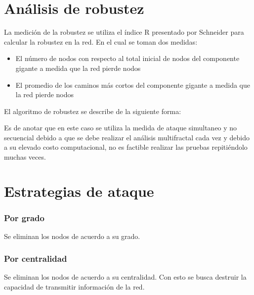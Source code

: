 \section{Análisis de robustez}

La medición de la robustez se utiliza el índice R presentado por Schneider\cite{Schneider2011} para calcular la robustez en la red. En el cual se toman dos medidas:

\begin{itemize}
    \item El número de nodos con respecto al total inicial de nodos del componente gigante a medida que la red pierde nodos
    \item El promedio de los caminos más cortos del componente gigante a medida que la red pierde nodos
\end{itemize}

El algoritmo de robustez se describe de la siguiente forma:


Es de anotar que en este caso se utiliza la medida de ataque simultaneo y no secuencial debido a que se debe realizar el análisis multifractal cada vez y debido a su elevado costo computacional, no es factible realizar las pruebas repitiéndolo muchas veces.

\section{Estrategias de ataque}


\subsubsection{Por grado}

Se eliminan los nodos de acuerdo a su grado.

\subsubsection{Por centralidad}

Se eliminan los nodos de acuerdo a su centralidad. Con esto se busca destruir la capacidad de transmitir información de la red.